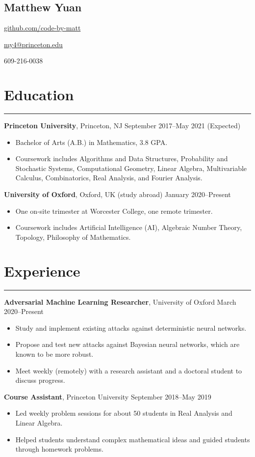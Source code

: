 \documentclass[10pt]{article}
\newcommand{\name}[1]{\begin{center}\section*{\huge #1}\end{center}}
\newcommand{\topinfo}[1]{\begin{center}\vspace{-0.2cm}#1\vspace{-0.2cm}\end{center}}
\newcommand{\resumesection}[1]{\vspace{-0.2cm}\section*{#1}\vspace{-0.2cm}\hrule\vspace{0.2cm}}
\begin{document}
\name{Matthew Yuan}
\topinfo{\href{https://github.com/code-by-matt}{github.com/code-by-matt}}
\topinfo{\href{mailto:my4@princeton.edu}{my4@princeton.edu}}
\topinfo{609-216-0038}

\resumesection{Education}

\textbf{Princeton University}, Princeton, NJ \hfill September 2017--May 2021 (Expected)
\begin{itemize}
	\item Bachelor of Arts (A.B.) in Mathematics, 3.8 GPA.
	\item Coursework includes Algorithms and Data Structures, Probability and Stochastic Systems, Computational Geometry, Linear Algebra, Multivariable Calculus, Combinatorics, Real Analysis, and Fourier Analysis.
\end{itemize}

\textbf{University of Oxford}, Oxford, UK (study abroad) \hfill January 2020--Present
\begin{itemize}
	\item One on-site trimester at Worcester College, one remote trimester.
	\item Coursework includes Artificial Intelligence (AI), Algebraic Number Theory, Topology, Philosophy of Mathematics.
\end{itemize}

\resumesection{Experience}

\textbf{Adversarial Machine Learning Researcher}, University of Oxford \hfill March 2020--Present
\begin{itemize}
	\item Study and implement existing attacks against deterministic neural networks.
	\item Propose and test new attacks against Bayesian neural networks, which are known to be more robust.
	\item Meet weekly (remotely) with a research assistant and a doctoral student to discuss progress.
\end{itemize}

\textbf{Course Assistant}, Princeton University \hfill September 2018--May 2019
\begin{itemize}
	\item Led weekly problem sessions for about 50 students in Real Analysis and Linear Algebra.
	\item Helped students understand complex mathematical ideas and guided students through homework problems.
\end{itemize}
\end{document}
